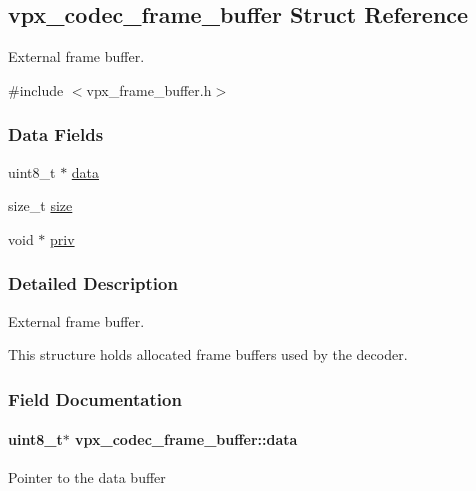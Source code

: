 \hypertarget{structvpx__codec__frame__buffer}{}\subsection{vpx\+\_\+codec\+\_\+frame\+\_\+buffer Struct Reference}
\label{structvpx__codec__frame__buffer}


External frame buffer.  




{\ttfamily \#include $<$vpx\+\_\+frame\+\_\+buffer.\+h$>$}

\subsubsection*{Data Fields}
\begin{DoxyCompactItemize}
\item 
uint8\+\_\+t $\ast$ \hyperlink{structvpx__codec__frame__buffer_adcfd9dc0e57e1dad453c4496d8bbce30}{data}
\item 
size\+\_\+t \hyperlink{structvpx__codec__frame__buffer_aa36d70c1f42be1cd31287b8ecf7b53a5}{size}
\item 
void $\ast$ \hyperlink{structvpx__codec__frame__buffer_a7037d613f7b54f9cdad629cf17cb5e18}{priv}
\end{DoxyCompactItemize}


\subsubsection{Detailed Description}
External frame buffer. 

This structure holds allocated frame buffers used by the decoder. 

\subsubsection{Field Documentation}
\paragraph[{\texorpdfstring{data}{data}}]{\setlength{\rightskip}{0pt plus 5cm}uint8\+\_\+t$\ast$ vpx\+\_\+codec\+\_\+frame\+\_\+buffer\+::data}\hypertarget{structvpx__codec__frame__buffer_adcfd9dc0e57e1dad453c4496d8bbce30}{}\label{structvpx__codec__frame__buffer_adcfd9dc0e57e1dad453c4496d8bbce30}
Pointer to the data buffer 
